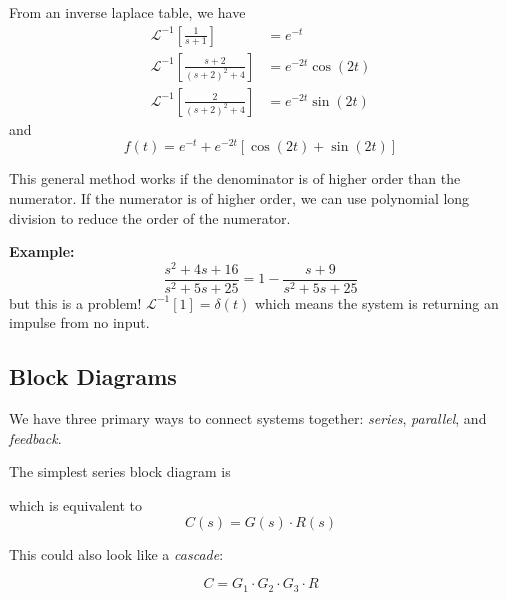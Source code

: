 \documentclass[12pt]{article}
\renewcommand{\L}{\mathcal{L}}
\newcommand*{\tbf}[1]{\ifmmode\mathbf{#1}\else\textbf{#1}\fi}
\newenvironment*{exercise}[1][red]{
    \begin{tcolorbox}[
        parbox=false,
        colback=#1!5!white,
        colframe=#1!75!black,
        breakable
    ]}
    {\end{tcolorbox}}
\begin{document}
\begin{exercise}
    From an inverse laplace table, we have 
    \begin{align*}
        \L^{-1}\left[\frac{1}{s+1}\right] &= e^{-t}\\ 
        \L^{-1}\left[\frac{s+2}{(s+2)^2 + 4}\right] &= e^{-2t} \cos(2t)\\ 
        \L^{-1}\left[\frac{2}{(s+2)^2 + 4}\right] &= e^{-2t} \sin(2t)
    \end{align*}
    and 
    \[\boxed{f(t) = e^{-t} + e^{-2t}[\cos(2t) + \sin(2t)]}\]
    
\end{exercise}

This general method works if the denominator is of higher order than the numerator. If the numerator is of higher order, we can use polynomial long division to reduce the order of the numerator.

\tbf{Example:} 
\[\frac{s^2 + 4s + 16}{s^2 + 5s + 25} = 1 - \frac{s + 9}{s^2 + 5s + 25}\]
but this is a problem! $\L^{-1}[1] = \delta(t)$ which means the system is returning an impulse from no input.

\subsection{Block Diagrams}

We have three primary ways to connect systems together: \emph{series}, \emph{parallel}, and \emph{feedback}.

The simplest series block diagram is
\begin{center}
\end{center}
which is equivalent to 
\[C(s) = G(s) \cdot R(s)\]

This could also look like a  \emph{cascade}:
\begin{center}
\end{center}
\[C = G_1 \cdot G_2 \cdot G_3 \cdot R\]
\end{document}
